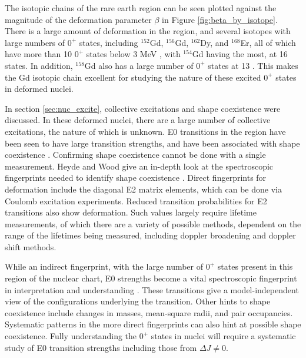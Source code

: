 The isotopic chains of the rare earth region can be seen plotted against the magnitude of the deformation parameter $\beta$ in Figure \ref{fig:beta_by_isotope}. There is a large amount of deformation in the region, and several isotopes with large numbers of $0^+$ states, including $^{152}$Gd, $^{156}$Gd, $^{162}$Dy, and $^{168}$Er, all of which have more than 10 $0^+$ states below 3 MeV \citep{meyer06:_zeroplus}, with $^{154}$Gd having the most, at 16 states. In addition, $^{158}$Gd also has a large number of $0^+$ states at 13 \citep{lesher02:_158gd}. This makes the Gd isotopic chain excellent for studying the nature of these excited $0^+$ states in deformed nuclei.

In section \ref{sec:nuc_excite}, collective excitations and shape coexistence were discussed. In these deformed nuclei, there are a large number of collective excitations, the nature of which is unknown. E0 transitions in the region have been seen to have large transition strengths, and have been associated with shape coexistence \citep{wood99:_e0}. Confirming shape coexistence cannot be done with a single measurement. Heyde and Wood give an in-depth look at the spectroscopic fingerprints needed to identify shape coexistence \citep{heyde11:_shape_coexist}. Direct fingerprints for deformation include the diagonal E2 matrix elements, which can be done via Coulomb excitation experiments. Reduced transition probabilities for E2 transitions also show deformation. Such values largely require lifetime measurements, of which there are a variety of possible methods, dependent on the range of the lifetimes being measured, including doppler broadening and doppler shift methods. 

While an indirect fingerprint, with the large number of $0^+$ states present in this region of the nuclear chart, E0 strengths become a vital spectroscopic fingerprint in interpretation and understanding \citep{heyde11:_shape_coexist}. These transitions give a model-independent view of the configurations underlying the transition. Other hints to shape coexistence include changes in masses, mean-square radii, and pair occupancies. Systematic patterns in the more direct fingerprints can also hint at possible shape coexistence. Fully understanding the $0^+$ states in nuclei will require a systematic study of E0 transition strengths including those from $\Delta J\neq0$.